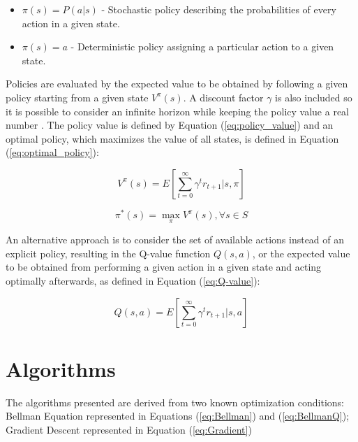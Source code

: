 \documentclass[journal]{IEEEtran}
\begin{document}
	\begin{itemize}
		 
		 \item $\pi(s) = P(a|s)$ - Stochastic policy describing the probabilities of every action in a given state.
		 	
		 \item $\pi(s) = a$ - Deterministic policy assigning a particular action to a given state.
		 
	\end{itemize}
		
	Policies are evaluated by the expected value to be obtained by following a given policy starting from a given state $V^\pi(s)$. A discount factor $\gamma$ is also included so it is possible to consider an infinite horizon while keeping the policy value a real number \cite{Eugene_A._Feinberg-MDP}. The policy value is defined by Equation (\ref{eq:policy_value}) and an optimal policy, which maximizes the value of all states, is defined in Equation (\ref{eq:optimal_policy}): 	
		 
	\begin{equation} \label{eq:policy_value}
		V^\pi(s) = E[\sum_{t=0}^{\infty} \gamma^t r_{t+1}| s, \pi]
	\end{equation}
		
	\begin{equation} \label{eq:optimal_policy}
		\pi^*(s) = \max_\pi V^\pi(s), \forall s \in S
	\end{equation}
		
	An alternative approach is to consider the set of available actions instead of an explicit policy, resulting in the Q-value function $Q(s,a)$\cite{watkins1989learning}, or the expected value to be obtained from performing a given action in a given state and acting optimally afterwards, as defined in Equation (\ref{eq:Q-value}):
		
	\begin{equation} \label{eq:Q-value}
		Q(s,a) =  E[\sum_{t=0}^{\infty} \gamma^t r_{t+1}| s, a]
	\end{equation}

\section{Algorithms}

	The algorithms presented are derived from two known optimization conditions: Bellman Equation \cite{Bellman-DP} represented in Equations (\ref{eq:Bellman}) and (\ref{eq:BellmanQ}); Gradient Descent \cite{lee2016gradient} represented in Equation (\ref{eq:Gradient})
	
\end{document}
